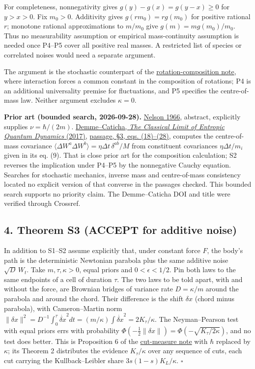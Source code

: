 \documentclass[11pt,a4paper]{article}
\begin{document}
For completeness, nonnegativity gives \(g(y)-g(x)=g(y-x)\ge0\) for
\(y>x>0\). Fix \(m_0>0\). Additivity gives \(g(rm_0)=r g(m_0)\) for
positive rational \(r\); monotone rational approximations to \(m/m_0\)
give \(g(m)=m g(m_0)/m_0\). Thus no measurability assumption or
empirical mass-continuity assumption is needed once P4--P5 cover all
positive real masses. A restricted list of species or correlated noises
would need a separate argument.

The argument is the stochastic counterpart of the
\href{rotation-composition-universality.md}{rotation-composition note},
where interaction forces a common constant in the composition of
rotations; P4 is an additional universality premise for fluctuations,
and P5 specifies the centre-of-mass law. Neither argument excludes
\(\kappa=0\).

\textbf{Prior art (bounded search, 2026-09-28).}
\href{https://doi.org/10.1103/PhysRev.150.1079}{Nelson 1966}, abstract,
explicitly supplies \(\nu=\hbar/(2m)\).
\href{https://doi.org/10.1063/1.4985370}{Demme--Caticha, \emph{The
Classical Limit of Entropic Quantum Dynamics} (2017)},
\href{https://arxiv.org/pdf/1612.01905}{passage, §3, eqs. (18)--(28)},
computes the centre-of-mass covariance
\(\langle\Delta W^a\Delta W^b\rangle=\eta\Delta t\,\delta^{ab}/M\) from
constituent covariances \(\eta\Delta t/m_i\) given in its eq. (9). That
is close prior art for the composition calculation; S2 reverses the
implication under P4--P5 by the nonnegative Cauchy equation. Searches
for stochastic mechanics, inverse mass and centre-of-mass consistency
located no explicit version of that converse in the passages checked.
This bounded search supports no priority claim. The Demme--Caticha DOI
and title were verified through Crossref.

\hypertarget{theorem-s3-accept-for-additive-noise}{%
\subsection{4. Theorem S3 (ACCEPT for additive
noise)}\label{theorem-s3-accept-for-additive-noise}}

In addition to S1--S2 assume explicitly that, under constant force
\(F\), the body's path is the deterministic Newtonian parabola plus the
same additive noise \(\sqrt{D}\,W_t\). Take \(m,\tau,\kappa>0\), equal
priors and \(0<\epsilon<1/2\). Pin both laws to the same endpoints of a
cell of duration \(\tau\). The two laws to be told apart, with and
without the force, are Brownian bridges of variance rate \(D=\kappa/m\)
around the parabola and around the chord. Their difference is the shift
\(\delta x\) (chord minus parabola), with Cameron--Martin norm
\(\|\delta x\|^2=D^{-1}\int_0^\tau\dot{\delta x}^2dt=(m/\kappa)\int\dot{\delta x}^2=2K_\tau/\kappa\).
The Neyman--Pearson test with equal priors errs with probability
\(\Phi(-\frac12\|\delta x\|)=\Phi(-\sqrt{K_\tau/2\kappa})\), and no test
does better. This is Proposition 6 of the
\href{cut-measure-newton.md}{cut-measure note} with \(\hbar\) replaced
by \(\kappa\); its Theorem 2 distributes the evidence \(K_\tau/\kappa\)
over any sequence of cuts, each cut carrying the Kullback--Leibler share
\(3s(1-s)K_L/\kappa\). \(\square\)
\end{document}
